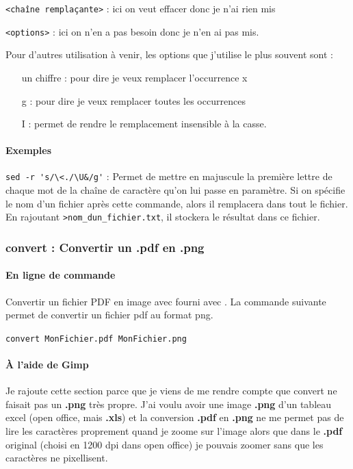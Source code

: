 \documentclass[a4paper,twoside]{article}
\begin{document}
{\blue \verb|<chaîne remplaçante>|} : ici on veut effacer donc je n'ai rien mis

{\blue \verb|<options>|} : ici on n'en a pas besoin donc je n'en ai pas mis.

Pour d'autres utilisation à  venir, les options que j'utilise le plus souvent sont :

\begin{itemize}
\item[un chiffre] : pour dire je veux remplacer l'occurrence x
\item[g] : pour dire je veux remplacer toutes les occurrences
\item[I] : permet de rendre le remplacement insensible à la casse.
\end{itemize}

\paragraph{Exemples}

\verb|sed -r 's/\<./\U&/g'| : Permet de mettre en majuscule la première lettre de chaque mot de la chaîne de caractère qu'on lui passe en paramètre. Si on spécifie le nom d'un fichier après cette commande, alors il remplacera dans tout le fichier. En rajoutant \verb|>nom_dun_fichier.txt|, il stockera le résultat dans ce fichier.



\subsubsection{convert : Convertir un .pdf en .png}
\paragraph{En ligne de commande}
Convertir un fichier PDF en image avec    fourni avec . La commande suivante permet de convertir un fichier pdf au format png.

\verb|convert MonFichier.pdf MonFichier.png|

\paragraph{À l'aide de Gimp}
Je rajoute cette section parce que je viens de me rendre compte que convert ne faisait pas un \textbf{.png} très propre. J'ai voulu avoir une image \textbf{.png} d'un tableau excel (open office, mais \textbf{.xls}) et la conversion \textbf{.pdf} en \textbf{.png} ne me permet pas de lire les caractères proprement quand je zoome sur l'image alors que dans le \textbf{.pdf} original (choisi en 1200 dpi dans open office) je pouvais zoomer sans que les caractères ne pixellisent.
\end{document}
